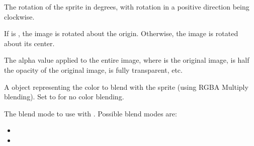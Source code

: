 \documentclass[letterpaper,10pt,english]{sphinxmanual}
\begin{document}
\begin{fulllineitems}
\begin{fulllineitems}
\end{fulllineitems}


\begin{fulllineitems}
\label{dsp:sge.dsp.Object.image_rotation}
The rotation of the sprite in degrees, with rotation in a
positive direction being clockwise.

If {\hyperref[dsp:sge.dsp.Object.regulate_origin]{\emph{}}} is , the image is rotated
about the origin.  Otherwise, the image is rotated about its
center.

\end{fulllineitems}


\begin{fulllineitems}
\label{dsp:sge.dsp.Object.image_alpha}
The alpha value applied to the entire image, where  is the
original image,  is half the opacity of the original
image,  is fully transparent, etc.

\end{fulllineitems}


\begin{fulllineitems}
\label{dsp:sge.dsp.Object.image_blend}
A {\hyperref[gfx:sge.gfx.Color]{\emph{}}} object representing the color to blend
with the sprite (using RGBA Multiply blending).  Set to
 for no color blending.

\end{fulllineitems}


\begin{fulllineitems}
\label{dsp:sge.dsp.Object.image_blend_mode}
The blend mode to use with {\hyperref[dsp:sge.dsp.Object.image_blend]{\emph{}}}.  Possible blend
modes are:
\begin{itemize}
\item {} 

\item {} 


\end{itemize}
\end{fulllineitems}
\end{fulllineitems}
\end{document}
